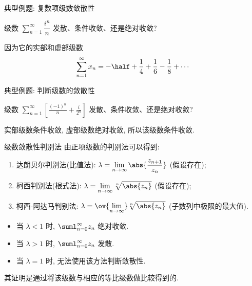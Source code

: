 \begin{frame}{典型例题: 复数项级数敛散性}
	\onslide<+->
	\begin{example}
		级数 $\displaystyle\sum_{n=1}^\infty\dfrac{i^n}n$ 发散、条件收敛、还是绝对收敛?
	\end{example}

	\onslide<+->
	\begin{solution}
		因为它的实部和虚部级数
	\[
		\sum_{n=1}^\infty x_n=-\half +\frac14+\frac16-\frac18+\cdots
	\]
	\onslide<+->{所以原级数条件收敛.}
	\end{solution}
\end{frame}


\begin{frame}{典型例题: 判断级数的敛散性}
	\onslide<+->
	\begin{exercise}
		级数 $\displaystyle\sum_{n=1}^\infty\left[\frac{(-1)^n}n+\frac i{2^n}\right]$ 发散、条件收敛、还是绝对收敛?
	\end{exercise}

	\onslide<+->
	\begin{answer}
		实部级数条件收敛, 虚部级数绝对收敛, 所以该级数条件收敛.
	\end{answer}
\end{frame}


\begin{frame}{级数敛散性判别法}
	由正项级数的判别法可以得到:
	\onslide<+->
	\begin{enumerate}
		\item \alert{达朗贝尔判别法(比值法)}: $\lambda=\displaystyle\lim_{n\to\infty}\abs{\frac{z_{n+1}}{z_n}}$ (假设存在);
		\item 柯西判别法(根式法): $\lambda=\displaystyle\lim_{n\to\infty}\sqrt[n]{\abs{z_n}}$ (假设存在);
		\item 柯西-阿达马判别法: $\lambda=\displaystyle\ov{\lim_{n\to\infty}}\sqrt[n]{\abs{z_n}}$ (子数列中极限的最大值).
	\end{enumerate}

	\begin{itemize}
		\item 当 $\lambda<1$ 时, $\suml_{n=0}^\infty z_n$ 绝对收敛.
		\item 当 $\lambda>1$ 时, $\suml_{n=0}^\infty z_n$ 发散.
		\item 当 $\lambda=1$ 时, 无法使用该方法判断敛散性.
	\end{itemize}
	\onslide<+->
	其证明是通过将该级数与相应的等比级数做比较得到的.
\end{frame}


